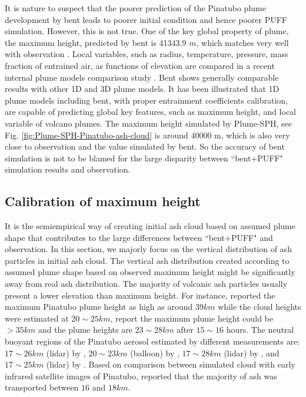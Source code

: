 It is nature to suspect that the poorer prediction of the Pinatubo plume development by bent leads to poorer initial condition and hence poorer PUFF simulation. However, this is not true. One of the key global property of plume, the maximum height, predicted by bent is 41343.9 $m$, which matches very well with observation \citep{lynch1996mount}. Local variables, such as radius, temperature, pressure, mass fraction of entrained air, as functions of elevation are compared in a recent internal plume models comparison study \citep{costa2016results}. Bent shows generally comparable results with other 1D and 3D plume models. It has been illustrated that 1D plume models including bent, with proper entrainment coefficients calibration, are capable of predicting global key features, such as maximum height, and local variable of volcano plumes. The maximum height simulated by Plume-SPH, see Fig. \ref{fig:Plume-SPH-Pinatubo-ash-cloud} is around 40000 m, which is also very close to observation and the value simulated by bent. So the accuracy of bent simulation is not to be blamed for the large disparity between ``bent+PUFF" simulation results and observation.

\subsection{Calibration of maximum height}

It is the semiempirical way of creating initial ash cloud based on assumed plume shape that contributes to the large differences between ``bent+PUFF" and observation. In this section, we majorly focus on the vertical distribution of ash particles in initial ash cloud. The vertical ash distribution created according to assumed plume shape based on observed maximum height might be significantly away from real ash distribution.
The majority of volcanic ash particles usually present a lower elevation than maximum height. For instance, \citet{holasek1996satellite, holasek1996experiments} reported the maximum Pinatubo plume height as high as around $39 km$ while the cloud heights were estimated at $20 \sim 25 km $, \citet{self1993atmospheric} report the maximum plume height could be $>35 km$ and the plume heights are $23 \sim 28 km$ after $15 \sim 16$ hours. The neutral buoyant regions of the Pinatubo aerosol estimated by different measurements are: $17 \sim 26 km$ (lidar) by \citet{defoor1992early}, $20 \sim 23 km$ (balloon) by \citet{deshler1992balloonborne}, $17 \sim 28 km$ (lidar) by \citet{jager1992pinatubo}, and $17 \sim 25 km$ (lidar) by \citet{avdyushin19931}. Based on comparison between simulated cloud with early infrared satellite images of Pinatubo, \citet{fero2008simulation} reported that the majority of ash was transported between $16$ and $18 km$. 

